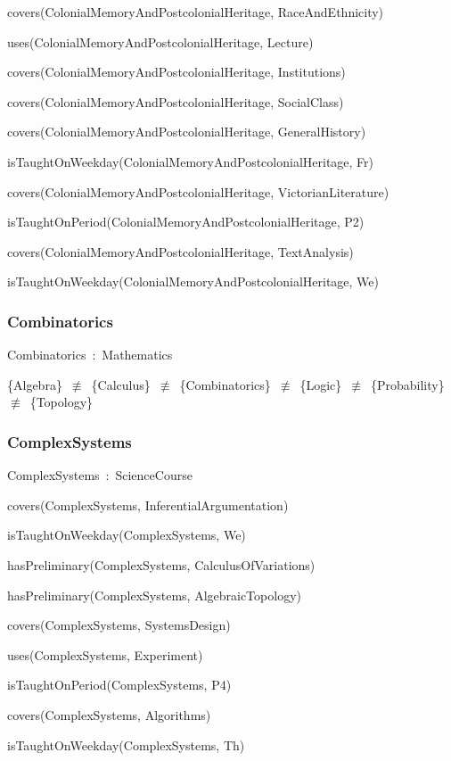 \documentclass{article}
\begin{document}
covers(ColonialMemoryAndPostcolonialHeritage, RaceAndEthnicity)

uses(ColonialMemoryAndPostcolonialHeritage, Lecture)

covers(ColonialMemoryAndPostcolonialHeritage, Institutions)

covers(ColonialMemoryAndPostcolonialHeritage, SocialClass)

covers(ColonialMemoryAndPostcolonialHeritage, GeneralHistory)

isTaughtOnWeekday(ColonialMemoryAndPostcolonialHeritage, Fr)

covers(ColonialMemoryAndPostcolonialHeritage, VictorianLiterature)

isTaughtOnPeriod(ColonialMemoryAndPostcolonialHeritage, P2)

covers(ColonialMemoryAndPostcolonialHeritage, TextAnalysis)

isTaughtOnWeekday(ColonialMemoryAndPostcolonialHeritage, We)

\subsubsection*{Combinatorics}

Combinatorics~:~Mathematics

\{Algebra\}~\ensuremath{\not\equiv}~\{Calculus\}~\ensuremath{\not\equiv}~\{Combinatorics\}~\ensuremath{\not\equiv}~\{Logic\}~\ensuremath{\not\equiv}~\{Probability\}~\ensuremath{\not\equiv}~\{Topology\}

\subsubsection*{ComplexSystems}

ComplexSystems~:~ScienceCourse

covers(ComplexSystems, InferentialArgumentation)

isTaughtOnWeekday(ComplexSystems, We)

hasPreliminary(ComplexSystems, CalculusOfVariations)

hasPreliminary(ComplexSystems, AlgebraicTopology)

covers(ComplexSystems, SystemsDesign)

uses(ComplexSystems, Experiment)

isTaughtOnPeriod(ComplexSystems, P4)

covers(ComplexSystems, Algorithms)

isTaughtOnWeekday(ComplexSystems, Th)
\end{document}
